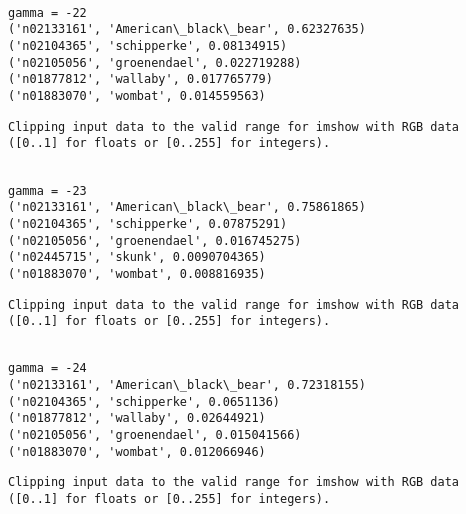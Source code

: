 \documentclass[11pt]{article}
\begin{document}
    \begin{Verbatim}[commandchars=\\\{\}]

gamma = -22
('n02133161', 'American\_black\_bear', 0.62327635)
('n02104365', 'schipperke', 0.08134915)
('n02105056', 'groenendael', 0.022719288)
('n01877812', 'wallaby', 0.017765779)
('n01883070', 'wombat', 0.014559563)

    \end{Verbatim}

    \begin{Verbatim}[commandchars=\\\{\}]
Clipping input data to the valid range for imshow with RGB data ([0..1] for floats or [0..255] for integers).

    \end{Verbatim}

    \begin{Verbatim}[commandchars=\\\{\}]

gamma = -23
('n02133161', 'American\_black\_bear', 0.75861865)
('n02104365', 'schipperke', 0.07875291)
('n02105056', 'groenendael', 0.016745275)
('n02445715', 'skunk', 0.0090704365)
('n01883070', 'wombat', 0.008816935)

    \end{Verbatim}

    \begin{Verbatim}[commandchars=\\\{\}]
Clipping input data to the valid range for imshow with RGB data ([0..1] for floats or [0..255] for integers).

    \end{Verbatim}

    \begin{Verbatim}[commandchars=\\\{\}]

gamma = -24
('n02133161', 'American\_black\_bear', 0.72318155)
('n02104365', 'schipperke', 0.0651136)
('n01877812', 'wallaby', 0.02644921)
('n02105056', 'groenendael', 0.015041566)
('n01883070', 'wombat', 0.012066946)

    \end{Verbatim}

    \begin{Verbatim}[commandchars=\\\{\}]
Clipping input data to the valid range for imshow with RGB data ([0..1] for floats or [0..255] for integers).

    \end{Verbatim}
\end{document}

